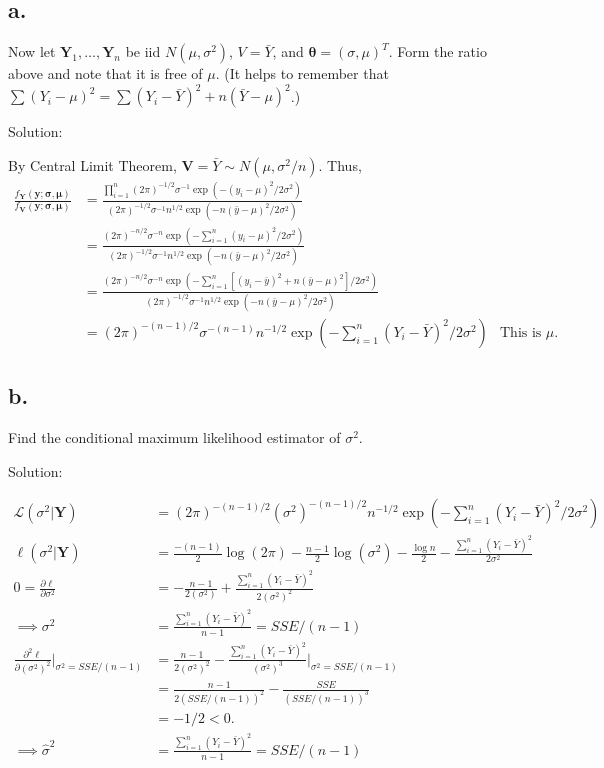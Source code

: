 \documentclass[
  letterpaper,
  DIV=11,
  numbers=noendperiod]{scrreprt}
\begin{document}
\hypertarget{a.-1}{%
\subsection{a.}\label{a.-1}}

Now let \(\mathbf Y_1, \dots, \mathbf Y_n\) be iid \(N(\mu,\sigma^2)\),
\(V=\bar Y\), and \(\boldsymbol \theta = (\sigma, \mu)^T\). Form the
ratio above and note that it is free of \(\mu\). (It helps to remember
that \(\sum (Y_i-\mu)^2= \sum (Y_i- \bar Y)^2 + n(\bar Y - \mu)^2\).)

Solution:

By Central Limit Theorem,
\(\mathbf V = \bar Y \sim N(\mu, \sigma^2/n)\). Thus, \[ \begin{aligned}
\frac{f_{\mathbf Y}(\mathbf y; \boldsymbol \sigma, \boldsymbol \mu)}{f_{\mathbf V}(\mathbf y; \boldsymbol \sigma, \boldsymbol \mu)} &= \frac{\prod_{i=1}^n(2\pi)^{-1/2}\sigma^{-1}\exp(-(y_i- \mu)^2/2\sigma^2)}{(2\pi)^{-1/2}\sigma^{-1}n^{1/2}\exp(-n(\bar y- \mu)^2/2\sigma^2)} \\
&= \frac{(2\pi)^{-n/2}\sigma^{-n}\exp(-\sum_{i=1}^n(y_i- \mu)^2/2\sigma^2)}{(2\pi)^{-1/2}\sigma^{-1}n^{1/2}\exp(-n(\bar y- \mu)^2/2\sigma^2)} \\
&= \frac{(2\pi)^{-n/2}\sigma^{-n}\exp(-\sum_{i=1}^n[(y_i- \bar y)^2 + n(\bar y - \mu)^2]/2\sigma^2)}{(2\pi)^{-1/2}\sigma^{-1}n^{1/2}\exp(-n(\bar y- \mu)^2/2\sigma^2)} \\
&=(2\pi)^{-(n-1)/2}\sigma^{-(n-1)}n^{-1/2}\exp\left({-\sum_{i=1}^n (Y_i- \bar Y)^2}/{2\sigma^2}\right) &\text{This is free of}~\mu.
\end{aligned}\]

\hypertarget{b.-1}{%
\subsection{b.}\label{b.-1}}

Find the conditional maximum likelihood estimator of \(\sigma^2\).

Solution:

\[\begin{aligned}
\mathcal L (\sigma^2| \mathbf Y)&=(2\pi)^{-(n-1)/2}(\sigma^2)^{-(n-1)/2}n^{-1/2}\exp\left({-\sum_{i=1}^n (Y_i- \bar Y)^2}/{2\sigma^2}\right) \\
\ell (\sigma^2| \mathbf Y)&=\frac{-(n-1)}{2}\log(2\pi)-\frac{n-1}{2}\log(\sigma^2) -\frac{\log n}{2} -\frac{\sum_{i=1}^n (Y_i- \bar Y)^2}{2\sigma^2} \\
0 = \frac{\partial \ell}{\partial \sigma^2}&=-\frac{n-1}{2(\sigma^2)} +\frac{\sum_{i=1}^n (Y_i- \bar Y)^2}{2(\sigma^2)^2}\\
\implies \sigma^2 &= \frac{\sum_{i=1}^n (Y_i- \bar Y)^2}{n-1}= SSE/(n-1) \\
\frac{\partial^2 \ell}{\partial (\sigma^2)^2} \bigg|_{\sigma^2 = SSE/(n-1)}&=\frac{n-1}{2(\sigma^2)^2} -\frac{\sum_{i=1}^n (Y_i- \bar Y)^2}{(\sigma^2)^3} \bigg|_{\sigma^2 = SSE/(n-1)} \\
&=\frac{n-1}{2(SSE/(n-1))^2} -\frac{SSE}{(SSE/(n-1))^3}\\
&= -1/2 <0. \\
\implies \hat \sigma^2 &= \frac{\sum_{i=1}^n (Y_i- \bar Y)^2}{n-1}= SSE/(n-1) 
\end{aligned}\]
\end{document}
